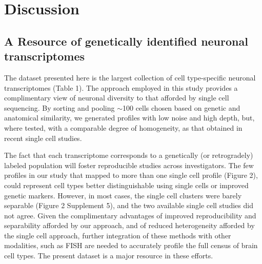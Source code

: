 
\section{Discussion}

\subsection{A Resource of genetically identified neuronal transcriptomes}

The dataset presented here is the largest collection of cell type-specific neuronal transcriptomes (Table 1). The approach employed in this study provides a complimentary view of neuronal diversity to that afforded by single cell sequencing. By sorting and pooling $\sim$100 cells chosen based on genetic and anatomical similarity, we generated profiles with low noise and high depth, but, where tested, with a comparable degree of homogeneity, as that obtained in recent single cell studies. 

The fact that each transcriptome corresponds to a genetically (or retrogradely) labeled population will foster reproducible studies across investigators. The few profiles in our study that mapped to more than one single cell profile (Figure 2), could represent cell types better distinguishable using single cells or improved genetic markers. However, in most cases, the single cell clusters were barely separable (Figure 2 Supplement 5), and the two available single cell studies did not agree. Given the complimentary advantages of improved reproducibility and separability afforded by our approach, and of reduced heterogeneity afforded by the single cell approach, further integration of these methods with other modalities, such as FISH \citep{Moffitt_2016} are needed to accurately profile the full census of brain cell types. The present dataset is a major resource in these efforts. 

